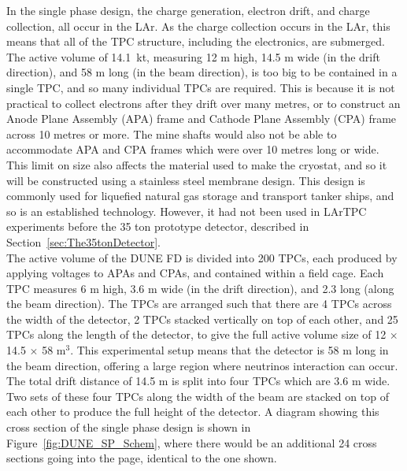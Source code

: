 In the single phase design, the charge generation, electron drift, and charge collection, all occur in the LAr. As the charge collection occurs in the LAr, this means that all of the TPC structure, including the electronics, are submerged. The active volume of 14.1~kt, measuring 12 m high, 14.5 m wide (in the drift direction), and 58 m long (in the beam direction), is too big to be contained in a single TPC, and so many individual TPCs are required. This is because it is not practical to collect electrons after they drift over many metres, or to construct an Anode Plane Assembly (APA) frame and Cathode Plane Assembly (CPA) frame across 10 metres or more. The mine shafts would also not be able to accommodate APA and CPA frames which were over 10 metres long or wide. This limit on size also affects the material used to make the cryostat, and so it will be constructed using a stainless steel membrane design. This design is commonly used for liquefied natural gas storage and transport tanker ships, and so is an established technology. However, it had not been used in LArTPC experiments before the 35 ton prototype detector, described in Section~\ref{sec:The35tonDetector}. \\

The active volume of the DUNE FD is divided into 200 TPCs, each produced by applying voltages to APAs and CPAs, and contained within a field cage. Each TPC measures 6 m high, 3.6 m wide (in the drift direction), and 2.3 long (along the beam direction). The TPCs are arranged such that there are 4 TPCs across the width of the detector, 2 TPCs stacked vertically on top of each other, and 25 TPCs along the length of the detector, to give the full active volume size of 12 $\times$ 14.5 $\times$ 58 m$^3$. This experimental setup means that the detector is 58 m long in the beam direction, offering a large region where neutrinos interaction can occur. The total drift distance of 14.5 m is split into four TPCs which are 3.6 m wide. Two sets of these four TPCs along the width of the beam are stacked on top of each other to produce the full height of the detector. A diagram showing this cross section of the single phase design is shown in Figure~\ref{fig:DUNE_SP_Schem}, where there would be an additional 24 cross sections going into the page, identical to the one shown. \\

